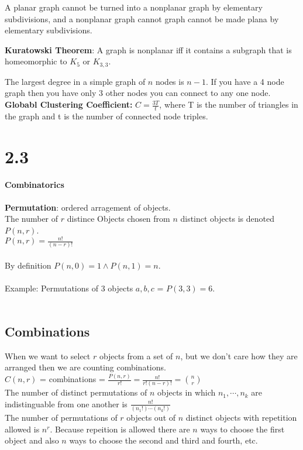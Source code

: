 \documentclass[14pt]{extreport}
\begin{document}
A planar graph cannot be turned into a nonplanar graph by elementary subdivisions, and a nonplanar graph cannot graph cannot be made plana by elementary subdivisions.

{\bf Kuratowski Theorem}: A graph is nonplanar iff it contains a subgraph that is homeomorphic to $K_5$ or $K_{3,3}$.

The largest degree in a simple graph of $n$ nodes is $n-1$. If you have a 4 node graph then you have only 3 other nodes
you can connect to any one node.\\

{\bf Globabl Clustering Coefficient:} $C = \frac{3T}{t}$, where T is the number of triangles in the graph and t is the number of connected node triples.
\section{2.3} \textbf{Combinatorics}\\
\\
\textbf{Permutation}: ordered arragement of objects.\\
The number of $r$ distince Objects chosen from $n$ distinct objects is denoted $P(n,r)$.\\
$P(n,r) = \frac{n!}{(n-r)!}$\\
\\
By definition $P(n,0)=1 \land P(n,1)=n$.\\
\\
Example: Permutations of 3 objects $a,b,c$ = $P(3,3)=6$.\\
\\
\subsection{Combinations}
When we want to select $r$ objects from a set of $n$, but we don't care how they are arranged then we are counting combinations.\\
$C(n,r)$ = combinations = $\frac{P(n,r)}{r!} = \frac{n!}{r!(n-r)!} = \binom{n}{r}$\\

The number of distinct permutations of $n$ objects in which $n_1 ,\cdots, n_k$ are indistinguable from one another is $\frac{n!}{(n_1!) \cdots (n_k!)}$\\

The number of permutations of $r$ objects out of $n$ distinct objects with repetition allowed is $n^r$. Because repeition is allowed there
are $n$ ways to choose the first object and also $n$ ways to choose the second and third and fourth, etc.\\
\end{document}
